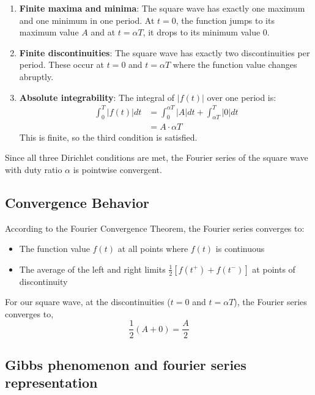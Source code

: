 \documentclass[12pt]{article}
\begin{document}
\begin{enumerate}
\item \textbf{Finite maxima and minima}: The square wave has exactly one maximum and one minimum in one period. At $t = 0$, the function jumps to its maximum value $A$ and at $t = \alpha T$, it drops to its minimum value $0$.

\item \textbf{Finite discontinuities}: The square wave has exactly two discontinuities per period. These occur at $t = 0$ and $t = \alpha T$ where the function value changes abruptly.

\item \textbf{Absolute integrability}: The integral of $|f(t)|$ over one period is:
\begin{align}
\int_0^T |f(t)| dt &= \int_0^{\alpha T} |A| dt + \int_{\alpha T}^T |0| dt \\
&= A \cdot \alpha T
\end{align}
This is finite, so the third condition is satisfied.
\end{enumerate}

Since all three Dirichlet conditions are met, the Fourier series of the square wave with duty ratio $\alpha$ is pointwise convergent.

\subsection{Convergence Behavior}

According to the Fourier Convergence Theorem, the Fourier series converges to:
\begin{itemize}
\item The function value $f(t)$ at all points where $f(t)$ is continuous
\item The average of the left and right limits $\frac{1}{2}[f(t^+) + f(t^-)]$ at points of discontinuity
\end{itemize}

For our square wave, at the discontinuities ($t = 0$ and $t = \alpha T$), the Fourier series converges to,
\begin{equation}
\frac{1}{2}(A + 0) = \frac{A}{2}
\end{equation}

\subsection{Gibbs phenomenon and fourier series representation}
\end{document}
